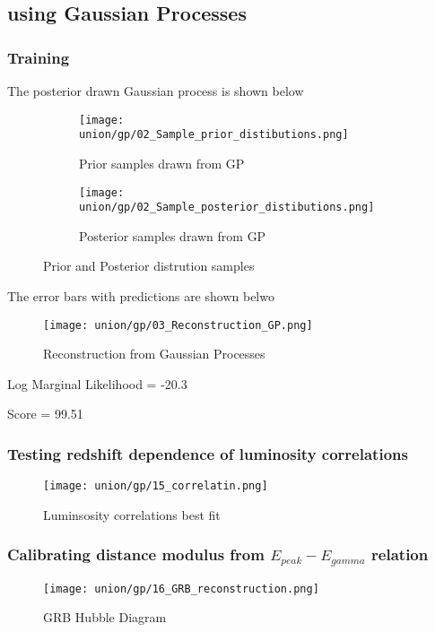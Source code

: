 \subsection{using Gaussian Processes}
\subsubsection{Training}
The posterior drawn Gaussian process is shown below

\begin{figure}[H]
	\centering
	\begin{subfigure}[t]{0.5\textwidth}
		\centering
		\texttt{[image: union/gp/02\_Sample\_prior\_distibutions.png]}
		\caption{Prior samples drawn from GP}
		\label{fig:prior_pantheon}
	\end{subfigure}%
	\begin{subfigure}[t]{0.5\textwidth}
		\centering
		\texttt{[image: union/gp/02\_Sample\_posterior\_distibutions.png]}
		\caption{Posterior samples drawn from GP}
		\label{fig:posterior_pantheon}
	\end{subfigure}
	\caption{Prior and Posterior distrution samples}
	\label{prior_posterior_pantheon_gp}
\end{figure}

The error bars with predictions are shown belwo
\begin{figure}[H]
	\centering
	\texttt{[image: union/gp/03\_Reconstruction\_GP.png]}
	\caption{Reconstruction from Gaussian Processes}
	\label{fig:gp_re_union}
\end{figure}

Log Marginal Likelihood = -20.3

Score = 99.51
\subsubsection{Testing redshift dependence of luminosity correlations}
\begin{figure}[H]
	\centering
	\texttt{[image: union/gp/15\_correlatin.png]}
	\caption{Luminsosity correlations best fit}
	\label{fig:correlation_gp_union}
\end{figure}
\subsubsection{Calibrating distance modulus from $E_{peak}-E_{gamma}$ relation}
\begin{figure}[H]
	\centering
	\texttt{[image: union/gp/16\_GRB\_reconstruction.png]}
	\caption{GRB Hubble Diagram}
	\label{fig:HD_GRB_GP_union}
\end{figure}
